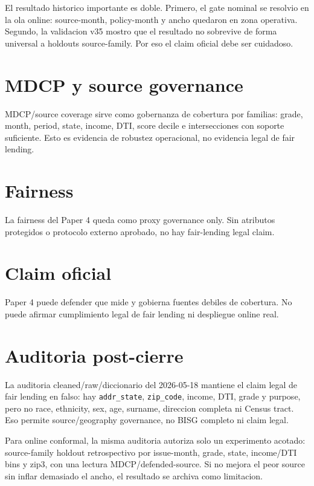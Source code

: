 \documentclass[
  spanish,
  11pt,
  letterpaper,
]{scrbook}
\theoremstyle{plain}
\theoremstyle{remark}
\begin{document}
El resultado historico importante es doble. Primero, el gate nominal se
resolvio en la ola online: source-month, policy-month y ancho quedaron
en zona operativa. Segundo, la validacion v35 mostro que el resultado no
sobrevive de forma universal a holdouts source-family. Por eso el claim
oficial debe ser cuidadoso.

\section{MDCP y source governance}\label{mdcp-y-source-governance}

MDCP/source coverage sirve como gobernanza de cobertura por familias:
grade, month, period, state, income, DTI, score decile e intersecciones
con soporte suficiente. Esto es evidencia de robustez operacional, no
evidencia legal de fair lending.

\section{Fairness}\label{fairness}

La fairness del Paper 4 queda como proxy governance only. Sin atributos
protegidos o protocolo externo aprobado, no hay fair-lending legal
claim.

\section{Claim oficial}\label{claim-oficial}

Paper 4 puede defender que mide y gobierna fuentes debiles de cobertura.
No puede afirmar cumplimiento legal de fair lending ni despliegue online
real.

\section{Auditoria post-cierre}\label{auditoria-post-cierre}

La auditoria cleaned/raw/diccionario del 2026-05-18 mantiene el claim
legal de fair lending en falso: hay \texttt{addr\_state},
\texttt{zip\_code}, income, DTI, grade y purpose, pero no race,
ethnicity, sex, age, surname, direccion completa ni Census tract. Eso
permite source/geography governance, no BISG completo ni claim legal.

Para online conformal, la misma auditoria autoriza solo un experimento
acotado: source-family holdout retrospectivo por issue-month, grade,
state, income/DTI bins y zip3, con una lectura MDCP/defended-source. Si
no mejora el peor source sin inflar demasiado el ancho, el resultado se
archiva como limitacion.
\end{document}

